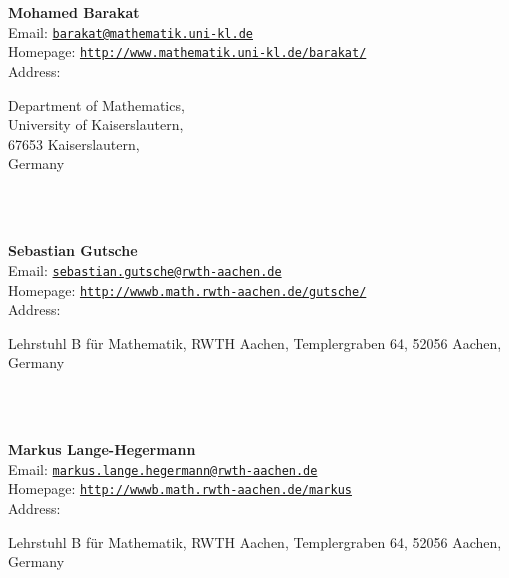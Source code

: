 \documentclass[a4paper,11pt]{report}
\begin{document}
\begin{titlepage}
\mbox{}\\
{\mbox{}\\
\small \noindent \textbf{Mohamed Barakat\\
    }  Email: \href{mailto://barakat@mathematik.uni-kl.de} {\texttt{barakat@mathematik.uni-kl.de}}\\
  Homepage: \href{http://www.mathematik.uni-kl.de/~barakat/} {\texttt{http://www.mathematik.uni-kl.de/\texttt{}barakat/}}\\
  Address: \begin{minipage}[t]{8cm}\noindent
 Department of Mathematics, \\
 University of Kaiserslautern, \\
 67653 Kaiserslautern, \\
 Germany \end{minipage}
}\\
{\mbox{}\\
\small \noindent \textbf{Sebastian Gutsche\\
    }  Email: \href{mailto://sebastian.gutsche@rwth-aachen.de} {\texttt{sebastian.gutsche@rwth-aachen.de}}\\
  Homepage: \href{http://wwwb.math.rwth-aachen.de/~gutsche/} {\texttt{http://wwwb.math.rwth-aachen.de/\texttt{}gutsche/}}\\
  Address: \begin{minipage}[t]{8cm}\noindent
 Lehrstuhl B f{\"u}r Mathematik, RWTH Aachen, Templergraben 64, 52056 Aachen,
Germany \end{minipage}
}\\
{\mbox{}\\
\small \noindent \textbf{Markus Lange-Hegermann\\
    }  Email: \href{mailto://markus.lange.hegermann@rwth-aachen.de} {\texttt{markus.lange.hegermann@rwth-aachen.de}}\\
  Homepage: \href{http://wwwb.math.rwth-aachen.de/~markus} {\texttt{http://wwwb.math.rwth-aachen.de/\texttt{}markus}}\\
  Address: \begin{minipage}[t]{8cm}\noindent
 Lehrstuhl B f{\"u}r Mathematik, RWTH Aachen, Templergraben 64, 52056 Aachen,
Germany \end{minipage}
}\\
\end{titlepage}
\end{document}
